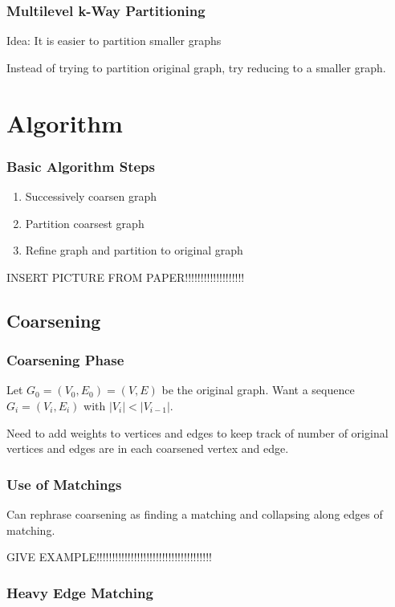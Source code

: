 \documentclass{beamer}
\begin{document}
\begin{frame}
  \frametitle{Multilevel k-Way Partitioning}

  \begin{block}{Idea:}
    It is easier to partition smaller graphs
  \end{block}

  Instead of trying to partition original graph, try reducing to a smaller graph.

\end{frame}

\section{Algorithm}

\begin{frame}
  \frametitle{Basic Algorithm Steps}

  \begin{enumerate}
    \item
      Successively coarsen graph
    \item
      Partition coarsest graph
    \item
      Refine graph and partition to original graph
  \end{enumerate}

  INSERT PICTURE FROM PAPER!!!!!!!!!!!!!!!!!!!

\end{frame}

\subsection{Coarsening}

\begin{frame}
  \frametitle{Coarsening Phase}

  Let $G_0 = (V_0, E_0) = (V,E)$ be the original graph. Want a sequence $G_i = (V_i, E_i)$ with $|V_i| < |V_{i-1}|$.

  Need to add weights to vertices and edges to keep track of number of original vertices and edges are in each coarsened vertex and edge.

\end{frame}

\begin{frame}
  \frametitle{Use of Matchings}

  Can rephrase coarsening as finding a matching and collapsing along edges of matching.

  GIVE EXAMPLE!!!!!!!!!!!!!!!!!!!!!!!!!!!!!!!!!!!!!

\end{frame}

\begin{frame}
  \frametitle{Heavy Edge Matching}
\end{frame}
\end{document}
